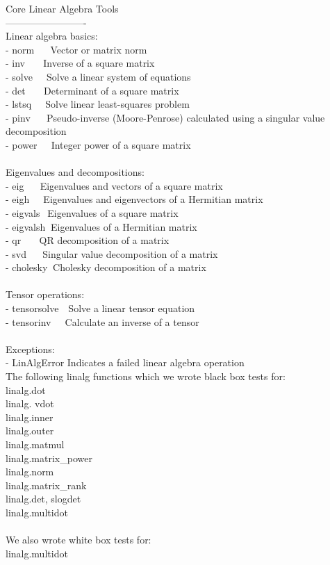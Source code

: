 \documentclass[a4paper,11pt]{article}
\begin{document}
Core Linear Algebra Tools\\
-------------------------\\
Linear algebra basics:\\
- norm$~~~~~~$             Vector or matrix norm\\
- inv$~~~~~~~$             Inverse of a square matrix\\
- solve$~~~~~$             Solve a linear system of equations\\
- det$~~~~~~~$             Determinant of a square matrix\\
- lstsq$~~~~~$             Solve linear least-squares problem\\
- pinv$~~~~~~$             Pseudo-inverse (Moore-Penrose) calculated using a singular value decomposition\\
- power$~~~~~$    Integer power of a square matrix\\
\\
Eigenvalues and decompositions:\\
- eig$~~~~~~$             Eigenvalues and vectors of a square matrix\\
- eigh$~~~~~$            Eigenvalues and eigenvectors of a Hermitian matrix\\
- eigvals$~~$         Eigenvalues of a square matrix\\
- eigvalsh$~$        Eigenvalues of a Hermitian matrix\\
- qr$~~~~~~~$              QR decomposition of a matrix\\
- svd$~~~~~~$             Singular value decomposition of a matrix\\
- cholesky$~$        Cholesky decomposition of a matrix\\
\\
Tensor operations:\\
- tensorsolve$~~~$     Solve a linear tensor equation\\
- tensorinv$~~~~~$       Calculate an inverse of a tensor\\
\\
Exceptions:\\
- LinAlgError     Indicates a failed linear algebra operation\\

The following linalg functions which we wrote black box tests for: \\
linalg.dot \\
linalg. vdot \\
linalg.inner \\
linalg.outer \\
linalg.matmul \\
linalg.matrix\_power\\
linalg.norm\\
linalg.matrix\_rank\\
linalg.det, slogdet \\
linalg.multidot \\
\\ 
We also wrote white box tests for:\\
linalg.multidot \\
\end{document}
